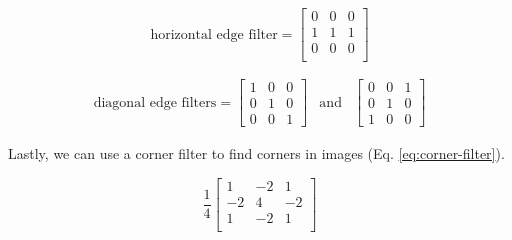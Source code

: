 \begin{equation}
    \text{horizontal edge filter} =\begin{bmatrix}
        0 & 0 & 0 \\
        1 & 1 & 1 \\
        0 & 0 & 0 \\
    \end{bmatrix}
    \label{eq:horiz-edge-filter}
\end{equation}

\begin{equation}
    \begin{aligned}
        \text{diagonal edge filters} = \begin{bmatrix}
            1 & 0 & 0 \\
            0 & 1 & 0\\
            0 & 0 & 1
        \end{bmatrix}& \text{and} & 
        \begin{bmatrix}
            0 & 0 & 1 \\
            0 & 1 & 0\\
            1 & 0 & 0
        \end{bmatrix}
    \end{aligned}
    \label{eq:diag-edge-filter}
\end{equation}

Lastly, we can use a corner filter to find corners in images (Eq. \ref{eq:corner-filter}).

\begin{equation}
    \frac{1}{4}\begin{bmatrix}
        1 & -2 & 1 \\
        -2 & 4 & -2 \\
        1 & -2 & 1 \\
    \end{bmatrix}
    \label{eq:corner-filter}
\end{equation}
